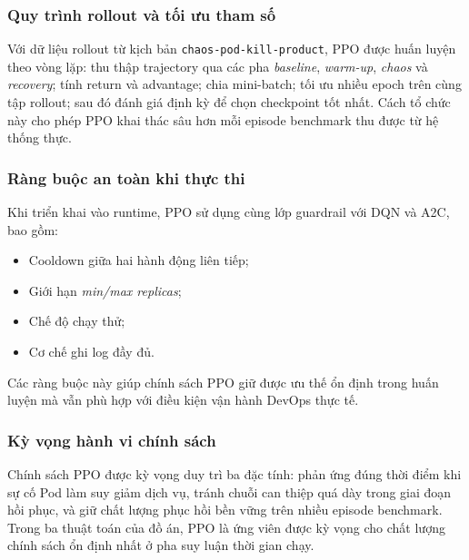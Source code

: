 \subsubsection{Quy trình rollout và tối ưu tham số}

\noindent Với dữ liệu rollout từ kịch bản \texttt{chaos-pod-kill-product}, PPO được huấn luyện theo vòng lặp: thu thập trajectory qua các pha \textit{baseline}, \textit{warm-up}, \textit{chaos} và \textit{recovery}; tính return và advantage; chia mini-batch; tối ưu nhiều epoch trên cùng tập rollout; sau đó đánh giá định kỳ để chọn checkpoint tốt nhất. Cách tổ chức này cho phép PPO khai thác sâu hơn mỗi episode benchmark thu được từ hệ thống thực.

\subsubsection{Ràng buộc an toàn khi thực thi}

\noindent Khi triển khai vào runtime, PPO sử dụng cùng lớp guardrail với DQN và A2C, bao gồm:
\begin{itemize}
    \item Cooldown giữa hai hành động liên tiếp;
    \item Giới hạn \textit{min/max replicas};
    \item Chế độ chạy thử;
    \item Cơ chế ghi log đầy đủ.
\end{itemize}
\noindent Các ràng buộc này giúp chính sách PPO giữ được ưu thế ổn định trong huấn luyện mà vẫn phù hợp với điều kiện vận hành DevOps thực tế.

\subsubsection{Kỳ vọng hành vi chính sách}

\noindent Chính sách PPO được kỳ vọng duy trì ba đặc tính: phản ứng đúng thời điểm khi sự cố Pod làm suy giảm dịch vụ, tránh chuỗi can thiệp quá dày trong giai đoạn hồi phục, và giữ chất lượng phục hồi bền vững trên nhiều episode benchmark. Trong ba thuật toán của đồ án, PPO là ứng viên được kỳ vọng cho chất lượng chính sách ổn định nhất ở pha suy luận thời gian chạy.
